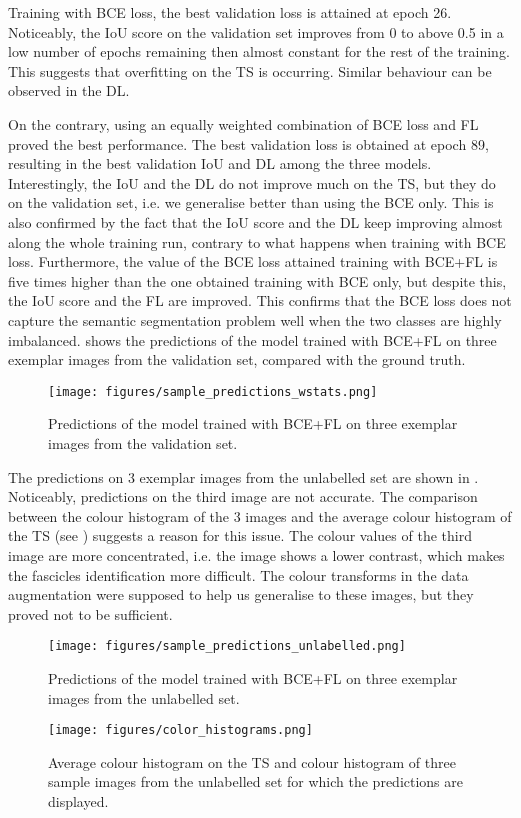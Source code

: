 \documentclass[conference]{IEEEtran}
\begin{document}
Training with BCE loss, the best validation loss is attained at epoch 26. Noticeably, the IoU score on the validation set improves from 0 to above 0.5 in a low number of epochs remaining then almost constant for the rest of the training. This suggests that overfitting on the TS is occurring. Similar behaviour can be observed in the DL.

On the contrary, using an equally weighted combination of BCE loss and FL proved the best performance.  The best validation loss is obtained at epoch 89, resulting in the best validation IoU and DL among the three models. Interestingly, the IoU and the DL do not improve much on the TS, but they do on the validation set, i.e. we generalise better than using the BCE only. This is also confirmed by the fact that the IoU score and the DL keep improving almost along the whole training run, contrary to what happens when training with BCE loss. Furthermore, the value of the BCE loss attained training with BCE+FL is five times higher than the one obtained training with BCE only, but despite this, the IoU score and the FL are improved. This confirms that the BCE loss does not capture the semantic segmentation problem well when the two classes are highly imbalanced.  shows the predictions of the model trained with BCE+FL on three exemplar images from the validation set, compared with the ground truth. 

\begin{figure}[ht]
\centering
\texttt{[image: figures/sample\_predictions\_wstats.png]}
\caption{Predictions of the model trained with BCE+FL on three exemplar images from the validation set.}
\label{fig:validation}
\end{figure}

The predictions on 3 exemplar images from the unlabelled set are shown in . Noticeably, predictions on the third image are not accurate. The comparison between the colour histogram of the 3 images and the average colour histogram of the TS (see ) suggests a reason for this issue. The colour values of the third image are more concentrated, i.e. the image shows a lower contrast, which makes the fascicles identification more difficult. The colour transforms in the data augmentation were supposed to help us generalise to these images, but they proved not to be sufficient.

\begin{figure}[ht]
\centering
\texttt{[image: figures/sample\_predictions\_unlabelled.png]}
\caption{Predictions of the model trained with BCE+FL on three exemplar images from the unlabelled set.}
\label{fig:unlabelled}
\end{figure}
\begin{figure}[ht]
\centering
\texttt{[image: figures/color\_histograms.png]}
\caption{Average colour histogram on the TS and colour histogram of three sample images from the unlabelled set for which the predictions are displayed.}
\label{fig:colour}
\end{figure}
\end{document}
